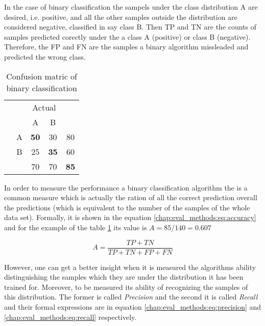 {In the case of binary classification the sampels under the class distribution A are desired, i.e. positive, and all the other samples outside the distribution are considered negative, classified in say class B. Then TP and TN are the counts of samples predicted corectly under the a class A (positive) or class B (negative). Therefore, the FP and FN are the samples a binary algorithm missleaded and predicted the wrong class. 

\begin{table}[H]
	\center
	\caption{Confusion matric of binary classification}\label{chap:eval_methods:tbl:bin_confusion}
	\begin{tabular}{c c c c c}
		& & \multicolumn{2}{c}{Actual} & \\
		\cline{3-4}
		\multirow{3}{*}{\rotatebox[origin=r]{90}{Predicted}} & & \multicolumn{1}{|c}{A} & \multicolumn{1}{c|}{B} & \\
		\cline{2-4}
		& \multicolumn{1}{|c}{A} & \multicolumn{1}{|c}{\textbf{50}} & \multicolumn{1}{c|}{30} & 80 \\
		& \multicolumn{1}{|c}{B} & \multicolumn{1}{|c}{25} & \multicolumn{1}{c|}{\textbf{35}} & 60 \\
		\cline{2-4}
		&  & 70 & 70 & \textbf{85}\\
	\end{tabular}
\end{table}

In order to measure the performance a binary classification algorithm the  is a common measure which is actually the ration of all the correct prediction overall the predictions (which is equivalent to the number of the samples of the whole data set). Formally, it is shown in the equation \ref{chap:eval_methods:eq:accuracy} and for the example of the table \ref{chap:eval_methods:tbl:bin_confusion} its value is $A = 85/140 = 0.607$

\begin{equation}\label{chap:eval_methods:eq:accuracy}
A = \frac {TP + TN} {TP +  TN + FP + FN}
\end{equation}

However, one can get a better insight when it is measured the algorithms ability distinguishing the samples which they are under the distribution it has been trained for. Moreover, to be measured its ability of recognizing the samples of this distribution. The former is called \textit{Precision} and the second it is called \textit{Recall} and their formal expressions are in equation \ref{chap:eval_methods:eq:precision} and \ref{chap:eval_methods:eq:recall} respectively. 

}
